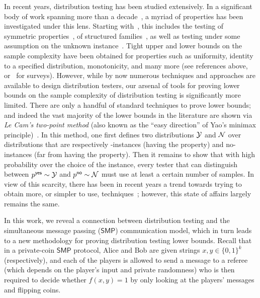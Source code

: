 \documentclass[11pt]{article}
\theoremstyle{remark}   	\newtheorem{remark}[theorem]{Remark}
\theoremstyle{definition}   	\newaliascnt{defn}{theorem}
\newcommand{\no}{{\sf{}no}\xspace}
\newcommand{\dyes}{{\cal Y}}
\newcommand{\dno}{{\cal N}}
\newcommand{\bitset}{\ensuremath{\{0,1\}}}
\newcommand{\SMP}{\ensuremath{\mathsf{SMP}}}
\begin{document}
In recent years, distribution testing has been studied extensively. In a significant body of work spanning more than a decade~\cite{BFFKRW:01,Paninski:04,BDKR:05,Paninski:08,ADJOP:11,BFRV:11,LRR:13,VV:14,CDVV:14,WY:14,JVW:14,BV:15,DK:16}, a myriad of properties has been investigated under this lens. Starting with~\cite{GRexp:00,BFRSW:10,BFFKRW:01}, this includes the testing of symmetric properties~\cite{RRSS:09,Valiant:11,ValiantValiant:11:stoc,ValiantValiant:11}, of structured families~\cite{BKR:04,ILR:12,AD:15,Canonne:15,ADK:15,CDGR:16,Canonne:16}, as well as testing under some assumption on the unknown instance~\cite{RS:09,DDSV:13,DKN:15,DKN:15:FOCS}. Tight upper and lower bounds on the sample complexity have been obtained for properties such as uniformity, identity to a specified distribution, monotonicity, and many more (see references above, or~\cite{Rubinfeld:12:Survey,Canonne:15:Survey} for surveys).
 However, while by now numerous techniques and approaches are available to design distribution testers, our arsenal of tools for proving lower bounds on the sample complexity of distribution testing is significantly more limited. There are only a handful of standard techniques to prove lower bounds; and indeed the vast majority of the lower bounds in the literature are shown via \emph{Le Cam's two-point method} (also known as the ``easy direction'' of Yao's minimax principle)~\cite{Yu:97,Pollard:2003}. In this method, one first defines two distributions $\dyes$ and $\dno$ over distributions that are respectively \yes-instances (having the property) and \no-instances (far from having the property). Then it remains to show that with high probability over the choice of the instance, every tester that can distinguish between $p^{\yes} \sim \dyes$ and $p^{\no} \sim \dno$ must use at least a certain number of samples. In view of this scarcity, there has been in recent years a trend towards trying to obtain more, or simpler to use, techniques~\cite{Valiant:11,DK:16}; however, this state of affairs largely remains the same.

In this work, we reveal a connection between distribution testing and the simultaneous message passing ($\SMP$) communication model, which in turn leads to a new methodology for proving distribution testing lower bounds. Recall that in a private-coin $\SMP$ protocol, Alice and Bob are given strings $x,y \in \bitset^k$ (respectively), and each of the players is allowed to send a message to a referee (which depends on the player's input and private randomness) who is then required to decide whether $f(x,y)=1$ by only looking at the players' messages and flipping coins.
\end{document}
